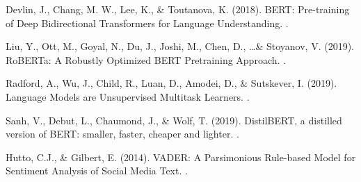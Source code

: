 \documentclass{article}
\begin{document}
\begin{thebibliography}{}

    Devlin, J., Chang, M. W., Lee, K., \& Toutanova, K. (2018).
    \newblock BERT: Pre-training of Deep Bidirectional Transformers for
    Language Understanding.
    .

    Liu, Y., Ott, M., Goyal, N., Du, J., Joshi, M., Chen, D., \ldots \&
    Stoyanov,
    V. (2019).
    \newblock RoBERTa: A Robustly Optimized BERT Pretraining Approach.
    .

    Radford, A., Wu, J., Child, R., Luan, D., Amodei, D., \& Sutskever, I.
    (2019).
    \newblock Language Models are Unsupervised Multitask Learners.
    .

    Sanh, V., Debut, L., Chaumond, J., \& Wolf, T. (2019).
    \newblock DistilBERT, a distilled version of BERT: smaller, faster, cheaper
    and lighter.
    .

    Hutto, C.J., \& Gilbert, E. (2014).
    \newblock VADER: A Parsimonious Rule-based Model for Sentiment Analysis of
    Social Media Text.
    .

\end{thebibliography}

\thispagestyle{empty}
\end{document}
